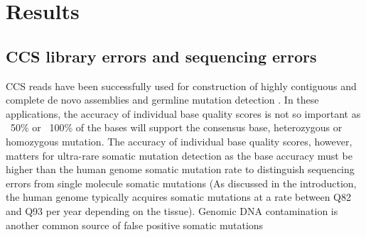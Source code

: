 \section{Results}

\subsection{CCS library errors and sequencing errors}

CCS reads have been successfully used for construction of highly contiguous and complete de novo assemblies \cite{Wenger2019-pw} and germline mutation detection \cite{Poplin2018-ub}. In these applications, the accuracy of individual base quality scores is not so important as ~50\% or ~100\% of the bases will support the consensus base, heterozygous or homozygous mutation. The accuracy of individual base quality scores, however, matters for ultra-rare somatic mutation detection as the base accuracy must be higher than the human genome somatic mutation rate to distinguish sequencing errors from single molecule somatic mutations (As discussed in the introduction, the human genome typically acquires somatic mutations at a rate between Q82 and Q93 per year depending on the tissue). Genomic DNA contamination is another common source of false positive somatic mutations \cite{Cibulskis2013-gw}

